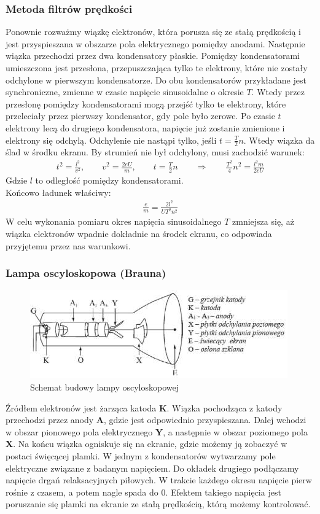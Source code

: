 \documentclass[paper=a4, fontsize=12pt]{scrartcl}
\begin{document}
\subsubsection{Metoda filtrów prędkości}
Ponownie rozważmy wiązkę elektronów, która porusza się ze stałą prędkością  i jest przyspieszana w obszarze pola elektrycznego pomiędzy anodami. Następnie wiązka przechodzi przez dwa kondensatory płaskie. Pomiędzy kondensatorami umieszczona jest przesłona, przepuszczająca tylko te elektrony, które nie zostały odchylone w pierwszym kondensatorze. Do obu kondensatorów przykładane jest synchroniczne, zmienne w czasie napięcie sinusoidalne o okresie $T$. Wtedy przez przesłonę pomiędzy kondensatorami mogą przejść tylko te elektrony, które przeleciały przez pierwszy kondensator, gdy pole było zerowe. Po czasie $t$ elektrony lecą do drugiego kondensatora, napięcie już zostanie zmienione i elektrony się odchylą. Odchylenie nie nastąpi tylko, jeśli $t=\frac{T}{2}n$.
Wtedy wiązka da ślad w środku ekranu. By strumień nie był odchylony, musi zachodzić warunek:
\begin{align*}
t^2=\frac{l^2}{v^2},\qquad
v^2=\frac{2eU}{m},\qquad t=\frac{T}{2}n\qquad\Rightarrow\qquad
\frac{T^2}{4}n^2=\frac{l^2m}{2eU}
\end{align*}
Gdzie $l$ to odległość pomiędzy kondensatorami.\\
Końcowo ładunek właściwy:
\begin{align}
\frac{e}{m}=\frac{2l^2}{UT^2n^2}
\end{align}
W celu wykonania pomiaru okres napięcia sinusoidalnego $T$ zmniejsza się, aż wiązka elektronów  wpadnie dokładnie na środek ekranu, co odpowiada przyjętemu przez nas warunkowi. 
\subsubsection{Lampa oscyloskopowa (Brauna)}
\begin{figure}[h!]
\centering
\includegraphics[width=0.6\linewidth]{lo}
\caption{Schemat budowy lampy oscyloskopowej}
\label{fig:lo}
\end{figure}
Źródłem elektronów jest żarząca katoda \textbf{K}. Wiązka pochodząca z katody przechodzi przez anody \textbf{A}, gdzie jest odpowiednio przyspieszana. Dalej wchodzi w obszar pionowego pola elektrycznego \textbf{Y}, a następnie w obszar poziomego pola \textbf{X}. Na końcu wiązka ogniskuje się na ekranie, gdzie możemy ją zobaczyć w postaci święcącej plamki.
W jednym z kondensatorów wytwarzamy pole elektryczne związane z badanym napięciem. Do okładek drugiego podłączamy napięcie drgań relaksacyjnych piłowych.
W trakcie każdego okresu napięcie pierw rośnie z czasem, a potem nagle spada do $0$. Efektem takiego napięcia jest poruszanie się plamki na ekranie ze stałą prędkością, którą możemy kontrolować.
\end{document}
